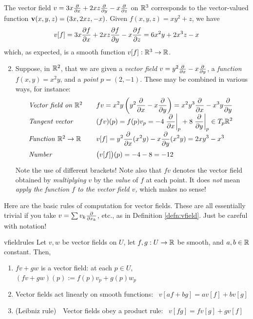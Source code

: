 \begin{examples}{}{}
	\exstart The vector field $v=3x\partials{x}+2xz\partials{y}-x\partials{z}$ on $\R^3$ corresponds to the vector-valued function $\vv(x,y,z)=(3x,2xz,-x)$. Given $f(x,y,z)=xy^2+z$, we have
	\[
		v[f]=3x\partials[f]{x}+2xz\partials[f]{y}-x\partials[f]{z}=6x^2y+2x^3z-x
	\]
	which, as expected, is a smooth function $v[f]:\R^3\to\R$.
	
	\begin{enumerate}\setcounter{enumi}{1}
		\item Suppose, in $\R^2$, that we are given a \emph{vector field} $v=y^2\partials{x}-x\partials{y}$, a \emph{function} $f(x,y)=x^2y$, and a \emph{point} $p=(2,-1)$. These may be combined in various ways, for instance:
		\[
			\def\arraystretch{1.7}
			\begin{array}{@{}l@{\qquad}l}
				\text{\emph{Vector field on $\R^2$}} & \displaystyle fv=x^2y\left(y^2\partials{x}-x\partials{y}\right) =x^2y^3\partials{x}-x^3y\partials{y} \\
	 			\text{\emph{Tangent vector}} & \displaystyle (fv)(p)=f(p) v_p=-4\partialsat{x}p+8\partialsat{y}p \in T_p\R^2 \\
				\text{\emph{Function} $\R^2\to\R$} & \displaystyle v[f]=y^2\partials{x}(x^2y)-x\partials{y}(x^2y)=2xy^3-x^3 \\
	 			\text{\emph{Number}} & \displaystyle \bigl(v[f]\bigr)(p) =-4-8=-12
			\end{array}
		\]
		Note the use of different brackets! Note also that $fv$ denotes the vector field obtained by \emph{multiplying} $v$ by the \emph{value} of $f$ at each point. It does \emph{not} mean \emph{apply the function $f$ to the vector field $v$,} which makes no sense!
	\end{enumerate}
\end{examples}

\goodbreak

Here are the basic rules of computation for vector fields. These are all essentially trivial if you take $v=\sum v_k\partials{x_k}$, etc., as in Definition \ref{defn:vfield}. Just be careful with notation!

\begin{lemm}{}{vfieldrules}
	Let $v,w$ be vector fields on $U$, let $f,g:U\to\R$ be smooth, and $a,b\in\R$ constant. Then,
	\begin{enumerate}
	  \item $fv+gw$ is a vector field: at each $p\in U$, $(fv+gw)(p):=f(p)v_p+g(p)w_p$
		\item Vector fields act linearly on smooth functions: \ $v[af+bg]=av[f]+bv[g]$
		\item (Leibniz rule)\ \ Vector fields obey a product rule: \ $v[fg]=fv[g]+gv[f]$
	\end{enumerate} 
\end{lemm}

